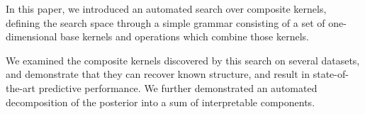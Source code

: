 \documentclass[twoside]{article}
\begin{document}
In this paper, we introduced an automated search over composite kernels, defining the search space through a simple grammar consisting of a set of one-dimensional base kernels and operations which combine those kernels.

We examined the composite kernels discovered by this search on several datasets, and demonstrate that they can recover known structure, and result in state-of-the-art predictive performance.  We further demonstrated an automated decomposition of the posterior into a sum of interpretable components.








\end{document}

